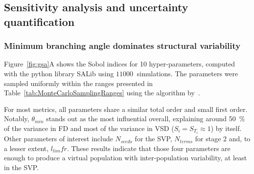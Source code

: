 \documentclass[11pt,]{article}
\begin{document}
\subsection{Sensitivity analysis and uncertainty quantification}\label{sec:gsaUQ}

\subsubsection{Minimum branching angle dominates structural variability}\label{sec:gsa}

Figure~\ref{fig:gsa}A shows the Sobol indices for \SI{10}{} hyper-parameters, computed with the python library SALib\cite{Iwanaga_2022,Herman_2017} using $\SI{11000}{}$ simulations.
The parameters were sampled uniformly within the ranges presented in Table~\ref{tab:MonteCarloSamplingRanges} using the algorithm by~\cite{Saltelli2002}.

For most metrics, all parameters share a similar total order and small first order.
Notably, $\theta_{min}$ stands out as the most influential overall, explaining around \SI{50}{\percent} of the variance in FD and most of the variance in VSD ($S_i=S_{T_i}\approx 1$) by itself.
Other parameters of interest include $N_{seeds}$ for the SVP, $N_{terms}$ for stage 2 and, to a lesser extent, $l_{lim}fr$.
These results indicate that those four parameters are enough to produce a virtual population with inter-population variability, at least in the SVP.

\begin{table}[ht!]
  \centering
  \caption{\label{tab:MonteCarloSamplingRanges}Ranges for the hyper-parameters for the computation of Sobol indices.}
\end{table}
\end{document}
